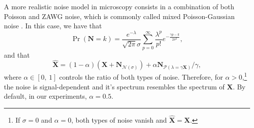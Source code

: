 \documentclass{article}
\begin{document}
A more realistic noise model in microscopy consists in a combination
of both Poisson and ZAWG noise, which is commonly called mixed
Poisson-Gaussian noise \cite{meiniel2018denoising}. In this
case, we have that
\begin{equation}
  \Pr({\mathbf N}{=}k) = \frac{e^{-\lambda}}{\sqrt{2\pi}\sigma}\sum_{p=0}^{\infty}\frac{\lambda^p}{p!} e^{-\frac{\gamma p - k}{2\sigma^2}},
  \label{eq:PN}
\end{equation}
and that
\begin{equation}
  \hat{\mathbf X} = (1-\alpha)(\mathbf{X} + {\mathbf N}_{\mathcal{N}(\sigma)}) + \alpha{\mathbf N}_{\mathcal{P}(\lambda=\gamma\mathbf{X})}/\gamma,
  \label{eq:MPG_noise_model} 
\end{equation}
where $\alpha\in[0,~1]$ controls the ratio of both types of
noise. Therefore, for $\alpha > 0$,\footnote{If $\sigma=0$ and
  $\alpha=0$, both types of noise vanish and
  $\hat{\mathbf{X}}=\mathbf{X}$.} the noise is signal-dependent and
it's spectrum resembles the spectrum of $\mathbf{X}$. By default, in
our experiments, $\alpha=0.5$.








\end{document}
